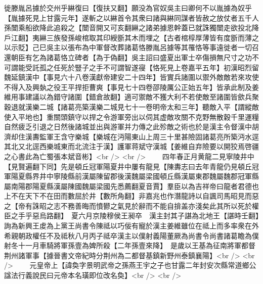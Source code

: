 徙滕胤呂據於交州乎綝復曰【復扶又翻】願没為官奴吳主曰卿何不以胤據為奴乎【胤據死見上甘露元年】遂斬之以綝首令其衆曰諸與綝同謀者皆赦之放仗者五千人孫闓乘船欲降此追殺之【闓音開又可亥翻綝之諸弟據恩幹蓋已就誅獨闓走欲投北降戶江翻】夷綝三族發孫峻棺取其印綬斵其木而埋之【古者棺椁厚薄皆有度斵而薄之以示貶】己巳吳主以張布為中軍督改葬諸葛恪滕胤呂據等其罹恪等事遠徙者一切召還朝臣有乞為諸葛恪立碑者【為于偽翻】吳主詔曰盛夏出軍士卒傷損無尺寸之功不可謂能受託孤之任死於豎子之手不可謂智遂寑【恪死見上卷嘉平五年】初漢昭烈留魏延鎮漢中【事見六十八卷漢獻帝建安二十四年】皆實兵諸圍以禦外敵敵若來攻使不得入及興埶之役王平捍拒曹爽【事見七十四卷邵陵厲公正始五年】皆承此制及姜維用事建議以為錯守諸圍【錯倉故翻】適可禦敵不獲大利不若使敵至諸圍皆歛兵聚穀退就漢樂二城【諸葛亮築漢樂二城見七十一卷明帝太和三年】聽敵入平【謂縱敵使入平地也】重關頭鎮守以捍之令游軍旁出以伺其虚敵攻關不克野無散穀千里運糧自然疲乏引退之日然後諸城並出與游軍并力傳之此殄敵之術也於是漢主令督漢中胡濟却住漢夀監軍王含守樂城【樂城在沔陽東山上周三十里甚險固諸葛亮所築沔水逕其北又北逕西樂城東而北流注于漢】護軍蒋斌守漢城【姜維自弃險要以開狡焉啓疆之心書此為亡蜀張本斌音彬】<br />
<br />
　　四年春正月黄龍二見寧陵井中【見賢遍翻下同】先是頓丘冠軍陽夏井中屢有龍見【陳夀志曰去年青龍仍見頓丘冠軍陽夏縣界井中寧陵縣前漢屬陳留郡後漢魏屬梁國頓丘縣漢屬東郡魏屬魏郡冠軍縣屬南陽郡陽夏縣漢屬陳國魏屬梁國先悉薦翻夏音賈】羣臣以為吉祥帝曰龍者君德也上不在天下不在田而數屈於井【數所角翻】非嘉兆也作潛龍詩以自諷司馬昭見而惡之【帝有誅昭之志不務善晦而憤鬰之氣見於辭而不能自揜盖亦淺矣此其所以死於權臣之手乎惡烏路翻】　夏六月京陵穆侯王昶卒　漢主封其子諶為北地王【諶時壬翻】詢為新興王䖍為上黨王尚書令陳祗以巧佞有寵於漢主姜維雖位在祗上而多率衆在外希親朝政權任不及祗秋八月丙子祗卒漢主以僕射義陽董厥為尚書令尚書諸葛瞻為僕射冬十一月車騎將軍孫壹為婢所殺【二年孫壹來降】　是歲以王基為征南將軍都督荆州諸軍事【據晉書文帝紀時分荆州為二都督基鎮新野州泰鎮襄陽】<br />
<br />
　　元皇帝上【諱奐字景明武帝之孫燕王宇之子也甘露二年封安次縣常道鄉公諡法行義說民曰元帝本名璜即位改名奐】<br />
<br />
